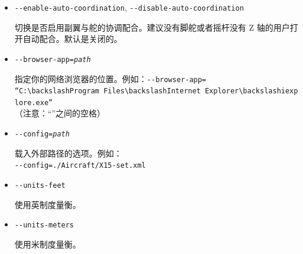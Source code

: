 {\begin{itemize}
  控制 \FlightGear{} 启动时是否是暂停状态。默认是不暂停。

\item{\texttt{-$ $-enable-auto-coordination}, \texttt{-$ $-disable-auto-coordination}}

  切换是否启用副翼与舵的协调配合。建议没有脚舵或者摇杆没有 Z 轴的用户打开自动配合。默认是关闭的。

\item{\texttt{-$ $-browser-app={\it path}}}

  指定你的网络浏览器的位置。例如：\texttt{-$ $-browser-app=}\\
    \texttt{``C:$\backslash$Program~Files$\backslash$Internet~Explorer$\backslash$iexplore.exe''}\\
    （注意：“”之间的空格）

\item{\texttt{-$ $-config={\it path}}}

  载入外部路径的选项。例如：\\
    \texttt{-$ $-config=./Aircraft/X15-set.xml}

\item{\texttt{-$ $-units-feet}}

  使用英制度量衡。

\item{\texttt{-$ $-units-meters}}

  使用米制度量衡。

\end{itemize}
  
}
\fi






